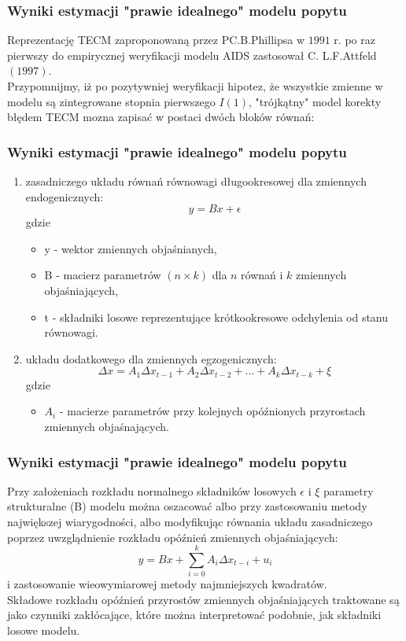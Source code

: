 \documentclass[11pt,usenames,dvipsnames,svgnames,x11names]{beamer}\usepackage[]{graphicx}\usepackage[]{color}
\theoremstyle{definition}
\theoremstyle{remark}
\begin{document}
  \begin {frame}
  \frametitle{Wyniki estymacji "prawie idealnego" modelu popytu }
Reprezentację TECM zaproponowaną przez PC.B.Phillipsa w $1991$ r. po raz pierwszy do empirycznej weryfikacji modelu AIDS zastosował C. L.F.Attfeld $(1997)$. \\
Przypomnijmy, iż po pozytywniej weryfikacji hipotez, że wszystkie zmienne w modelu są zintegrowane stopnia pierwszego $I(1)$, "trójkątny" model korekty błędem TECM mozna zapisać w postaci dwóch bloków równań:
\end{frame}

\begin{frame}
\frametitle{Wyniki estymacji "prawie idealnego" modelu popytu }
\begin{enumerate}
\item zasadniczego układu równań równowagi długookresowej dla zmiennych endogenicznych:
$$ y=Bx+\epsilon $$
gdzie

\begin{itemize}
\item y - wektor zmiennych objaśnianych,
\item B - macierz parametrów $(n\times k)$ dla $n$ równań i $k$ zmiennych objaśniających,
\item t - składniki losowe reprezentujące krótkookresowe odchylenia od stanu równowagi.
\end{itemize}

\item układu dodatkowego dla zmiennych egzogenicznych:
$$ \Delta x=A_1 \Delta x_{t-1} + A_2 \Delta x_{t-2}+...+A_k \Delta x_{t-k} + \xi$$
gdzie
\begin{itemize}
\item $A_i$ - macierze parametrów przy kolejnych opóźnionych przyrostach zmiennych objaśnających.
\end{itemize}
\end{enumerate}
 \end{frame}
 
 \begin{frame}
 \frametitle{Wyniki estymacji "prawie idealnego" modelu popytu }
Przy założeniach rozkładu normalnego składników losowych $\epsilon$ i $\xi$  parametry strukturalne (B) modelu można oszacować albo przy zastosowaniu metody największej wiarygodności, albo modyfikując równania układu zasadniczego poprzez uwzglądnienie rozkładu opóźnień zmiennych 
objaśniających:
$$ y=Bx+\sum_{i=0}^{k}A_i \Delta x_{t-i}+ u_i $$
i zastosowanie wieowymiarowej metody najmniejszych kwadratów.\\
Składowe rozkładu opóźnień przyrostów zmiennych objaśniających traktowane są jako czynniki zakłócające, które można interpretować podobnie, jak składniki losowe modelu.
\end{frame}
 
\end{document}
